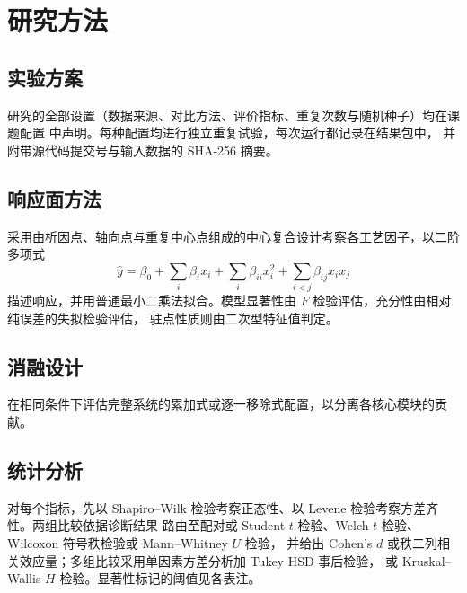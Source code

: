 \chapter{研究方法}
\label{chap:method}

\section{实验方案}
研究的全部设置（数据来源、对比方法、评价指标、重复次数与随机种子）均在课题配置
\texttt{\ThesisProfileId} 中声明。每种配置均进行独立重复试验，每次运行都记录在结果包中，
并附带源代码提交号与输入数据的 SHA-256 摘要。

\ifAutoHasRsm
\section{响应面方法}
采用由析因点、轴向点与重复中心点组成的中心复合设计考察各工艺因子，以二阶多项式
\begin{equation}
  \hat{y} = \beta_{0} + \sum_{i} \beta_{i} x_{i} + \sum_{i} \beta_{ii} x_{i}^{2}
            + \sum_{i<j} \beta_{ij} x_{i} x_{j}
\end{equation}
描述响应，并用普通最小二乘法拟合。模型显著性由 $F$ 检验评估，充分性由相对纯误差的失拟检验评估，
驻点性质则由二次型特征值判定。
\fi

\ifAutoHasAblation
\section{消融设计}
在相同条件下评估完整系统的累加式或逐一移除式配置，以分离各核心模块的贡献。
\fi

\section{统计分析}
对每个指标，先以 Shapiro--Wilk 检验考察正态性、以 Levene 检验考察方差齐性。两组比较依据诊断结果
路由至配对或 Student $t$ 检验、Welch $t$ 检验、Wilcoxon 符号秩检验或 Mann--Whitney $U$ 检验，
并给出 Cohen's $d$ 或秩二列相关效应量；多组比较采用单因素方差分析加 Tukey HSD 事后检验，
或 Kruskal--Wallis $H$ 检验。显著性标记的阈值见各表注。

